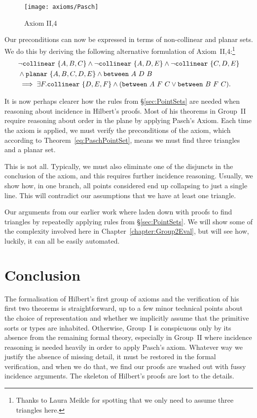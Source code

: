 \begin{figure}
\centering\texttt{[image: axioms/Pasch]}
\caption{Axiom II,4}
\label{fig:PaschDiagram}
\end{figure}

Our preconditions can now be expressed in terms of non-collinear and planar sets. We do this by deriving the following alternative formulation of Axiom~II,4:\footnote{Thanks to Laura Meikle for spotting that we only need to assume three triangles here.}
\begin{align}\label{eq:PaschPointSet}
  &\neg\code{collinear}\ \{A,B,C\}\wedge\neg\code{collinear}\ \{A,D,E\}\wedge\neg\code{collinear}\ \{C,D,E\}\\
  &\wedge\code{planar}\ \{A,B,C,D,E\}\wedge\between{A}{D}{B}\\
  &\implies\exists F. \code{collinear}\ \{D,E,F\} \wedge (\between{A}{F}{C}\vee\between{B}{F}{C}).
\end{align}

It is now perhaps clearer how the rules from \S\ref{sec:PointSets} are needed when reasoning about incidence in Hilbert's proofs. Most of his theorems in Group~II require reasoning about order in the plane by applying Pasch's Axiom. Each time the axiom is applied, we must verify the preconditions of the axiom, which according to Theorem~\ref{eq:PaschPointSet}, means we must find three triangles and a planar set. 

This is not all. Typically, we must also eliminate one of the disjuncts in the conclusion of the axiom, and this requires further incidence reasoning. Usually, we show how, in one branch, all points considered end up collapsing to just a single line. This will contradict our assumptions that we have at least one triangle.

Our arguments from our earlier work where laden down with proofs to find triangles by repeatedly applying rules from \S\ref{sec:PointSets}. We will show some of the complexity involved here in Chapter~\ref{chapter:Group2Eval}, but will see how, luckily, it can all be easily automated.

\section{Conclusion}
The formalisation of Hilbert's first group of axioms and the verification of his first two theorems is straightforward, up to a few minor technical points about the choice of representation and whether we implicitly assume that the primitive sorts or types are inhabited. Otherwise, Group~I is conspicuous only by its absence from the remaining formal theory, especially in Group~II where incidence reasoning is needed heavily in order to apply Pasch's axiom. Whatever way we justify the absence of missing detail, it must be restored in the formal verification, and when we do that, we find our proofs are washed out with fussy incidence arguments. The skeleton of Hilbert's proofs are lost to the details. 

